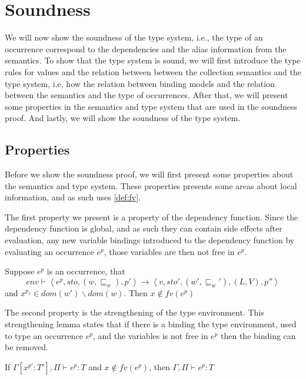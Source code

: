 \documentclass[../../master.tex]{subfiles}
\begin{document}
\section{Soundness}
We will now show the soundness of the type system, i.e., the type of an occurrence correspond to the dependencies and the alias information from the semantics.
To show that the type system is sound, we will first introduce the type rules for values and the relation between between the collection semantics and the type system, i.e, how the relation between binding models and the relation between the semantics and the type of occurrences.
After that, we will present some properties in the semantics and type system that are used in the soundness proof.
And lastly, we will show the soundness of the type system.




\subsection{Properties}
Before we show the soundness proof, we will first present some properties about the semantics and type system.
These properties presents some areas about local information, and as such uses \cref{def:fv}.

The first property we present is a property of the dependency function.
Since the dependency function is global, and as such they can contain side effects after evaluation, 
any new variable bindings introduced to the dependency function by evaluating an occurrence $e^p$, those variables are then not free in $e^p$.

\begin{lemma}[History]\label{lemma:His}
	Suppose $e^p$ is an occurrence, that
	$$env\vdash\left\langle e^{p},sto,(w,\sqsubseteq_w),p'\right\rangle\rightarrow\left\langle v,sto',(w',\sqsubseteq_w'),(L,V),p''\right\rangle$$
		and $x^{p_1}\in dom(w')\backslash dom(w)$.
		Then $x\notin fv(e^{p})$
\end{lemma}


The second property is the strengthening of the type environment.
This strengthening lemma states that if there is a binding the type environment, used to type an occurrence $e^p$, and the variables is not free in $e^p$ then the binding can be removed.

\begin{lemma}[Strengthening]\label{lemma:Strength}
	If $\Gamma[x^{p'}:T'],\Pi\vdash e^{p}:T$ and $x\notin fv(e^p)$, then $\Gamma,\Pi\vdash e^{p}:T$
\end{lemma}

\end{document}
